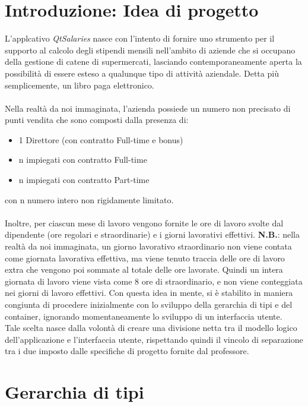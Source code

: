 \documentclass[a4paper,10pt]{article}
\begin{document}
\section{Introduzione: Idea di progetto}
L'applcativo \textit{QtSalaries} nasce con l'intento di fornire uno strumento per il supporto al calcolo degli stipendi mensili nell'ambito di aziende che si occupano della gestione di catene di supermercati, lasciando contemporaneamente aperta la possibilità di essere esteso a qualunque tipo di attività aziendale. Detta più semplicemente, un libro paga elettronico. \\ \\
Nella realtà da noi immaginata, l'azienda possiede un numero non precisato di punti vendita che sono composti dalla presenza di:
\begin{itemize}
\item 1 Direttore (con contratto Full-time e bonus)
\item n impiegati con contratto Full-time 
\item n impiegati con contratto Part-time
\end{itemize} 
con n numero intero non rigidamente limitato.\\ \\
Inoltre, per ciascun mese di lavoro vengono fornite le ore di lavoro svolte dal dipendente (ore regolari e straordinarie) e i giorni lavorativi effettivi. 
\textbf{N.B.}: nella realtà da noi immaginata, un giorno lavorativo straordinario non viene contata come giornata lavorativa effettiva, ma viene tenuto traccia delle ore di lavoro extra che vengono poi sommate al totale delle ore lavorate. Quindi un intera giornata di lavoro viene vista come 8 ore di straordinario, e non viene conteggiata nei giorni di lavoro effettivi.
Con questa idea in mente, si è stabilito in maniera congiunta di procedere inizialmente con lo sviluppo della gerarchia di tipi e del container, ignorando momentaneamente lo sviluppo di un interfaccia utente.\\
Tale scelta nasce dalla volontà di creare una divisione netta tra il modello logico dell'applicazione e l'interfaccia utente, rispettando quindi il vincolo di separazione tra i due imposto dalle specifiche di progetto fornite dal professore.

\section{Gerarchia di tipi}
\end{document}
